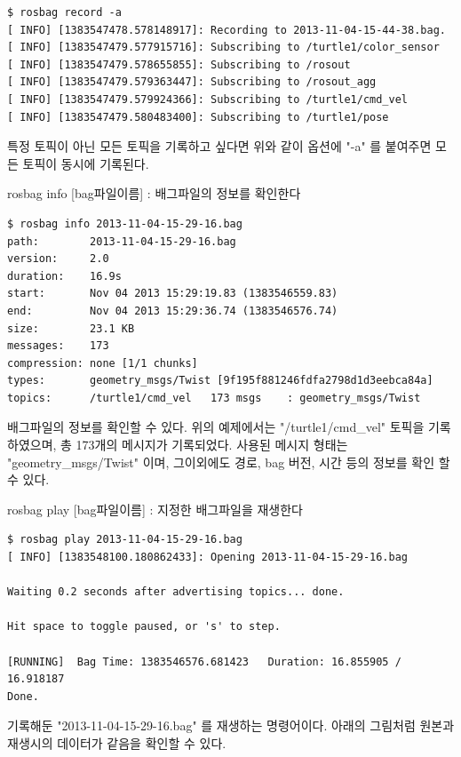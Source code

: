 \begin{lstlisting}[language=ROS]
$ rosbag record -a
[ INFO] [1383547478.578148917]: Recording to 2013-11-04-15-44-38.bag.
[ INFO] [1383547479.577915716]: Subscribing to /turtle1/color_sensor
[ INFO] [1383547479.578655855]: Subscribing to /rosout
[ INFO] [1383547479.579363447]: Subscribing to /rosout_agg
[ INFO] [1383547479.579924366]: Subscribing to /turtle1/cmd_vel
[ INFO] [1383547479.580483400]: Subscribing to /turtle1/pose
\end{lstlisting}

\noindent
특정 토픽이 아닌 모든 토픽을 기록하고 싶다면 위와 같이 옵션에 "-a" 를 붙여주면 모든 토픽이 동시에 기록된다.

\vspace{\baselineskip}
\noindent
{}\circled{\thenum} rosbag info [bag파일이름] : 배그파일의 정보를 확인한다

\begin{lstlisting}[language=ROS]
$ rosbag info 2013-11-04-15-29-16.bag 
path:        2013-11-04-15-29-16.bag
version:     2.0
duration:    16.9s
start:       Nov 04 2013 15:29:19.83 (1383546559.83)
end:         Nov 04 2013 15:29:36.74 (1383546576.74)
size:        23.1 KB
messages:    173
compression: none [1/1 chunks]
types:       geometry_msgs/Twist [9f195f881246fdfa2798d1d3eebca84a]
topics:      /turtle1/cmd_vel   173 msgs    : geometry_msgs/Twist
\end{lstlisting}

\noindent
배그파일의 정보를 확인할 수 있다. 위의 예제에서는 "/turtle1/cmd\_vel" 토픽을 기록하였으며, 총 173개의 메시지가 기록되었다. 사용된 메시지 형태는 "geometry\_msgs/Twist" 이며, 그이외에도 경로, bag 버전, 시간 등의 정보를 확인 할 수 있다.

\vspace{\baselineskip}
\noindent
{}\circled{\thenum} rosbag play [bag파일이름] : 지정한 배그파일을 재생한다

\begin{lstlisting}[language=ROS]
$ rosbag play 2013-11-04-15-29-16.bag 
[ INFO] [1383548100.180862433]: Opening 2013-11-04-15-29-16.bag

Waiting 0.2 seconds after advertising topics... done.

Hit space to toggle paused, or 's' to step.

[RUNNING]  Bag Time: 1383546576.681423   Duration: 16.855905 / 16.918187     
Done.
\end{lstlisting}

\noindent
기록해둔 "2013-11-04-15-29-16.bag" 를 재생하는 명령어이다. 아래의 그림처럼 원본과 재생시의 데이터가 같음을 확인할 수 있다.

